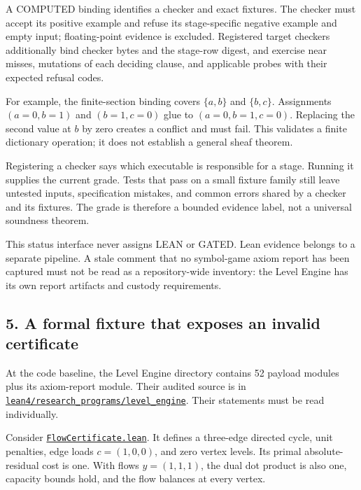\documentclass[
  11pt,
]{article}
\begin{document}
A COMPUTED binding identifies a checker and exact fixtures. The checker
must accept its positive example and refuse its stage-specific negative
example and empty input; floating-point evidence is excluded. Registered
target checkers additionally bind checker bytes and the stage-row
digest, and exercise near misses, mutations of each deciding clause, and
applicable probes with their expected refusal codes.

For example, the finite-section binding covers \(\{a,b\}\) and
\(\{b,c\}\). Assignments \((a=0,b=1)\) and \((b=1,c=0)\) glue to
\((a=0,b=1,c=0)\). Replacing the second value at \(b\) by zero creates a
conflict and must fail. This validates a finite dictionary operation; it
does not establish a general sheaf theorem.

Registering a checker says which executable is responsible for a stage.
Running it supplies the current grade. Tests that pass on a small
fixture family still leave untested inputs, specification mistakes, and
common errors shared by a checker and its fixtures. The grade is
therefore a bounded evidence label, not a universal soundness theorem.

This status interface never assigns LEAN or GATED. Lean evidence belongs
to a separate pipeline. A stale comment that no symbol-game axiom report
has been captured must not be read as a repository-wide inventory: the
Level Engine has its own report artifacts and custody requirements.

\hypertarget{a-formal-fixture-that-exposes-an-invalid-certificate}{%
\subsection{5. A formal fixture that exposes an invalid
certificate}\label{a-formal-fixture-that-exposes-an-invalid-certificate}}

At the code baseline, the Level Engine directory contains 52 payload
modules plus its axiom-report module. Their audited source is in
\href{https://github.com/dbccpage/the_symbol_game/blob/52cb5457f6c485ba548cfd292f6012a941ed22cf/lean4/research_programs/level_engine/README.md}{\nolinkurl{lean4/research_programs/level_engine}}.
Their statements must be read individually.

Consider
\href{https://github.com/dbccpage/the_symbol_game/blob/52cb5457f6c485ba548cfd292f6012a941ed22cf/lean4/research_programs/level_engine/FlowCertificate.lean}{\mbox{\nolinkurl{FlowCertificate.lean}}}.
It defines a three-edge directed cycle, unit penalties, edge loads
\(c=(1,0,0)\), and zero vertex levels. Its primal absolute-residual cost
is one. With flows \(y=(1,1,1)\), the dual dot product is also one,
capacity bounds hold, and the flow balances at every vertex.
\end{document}
